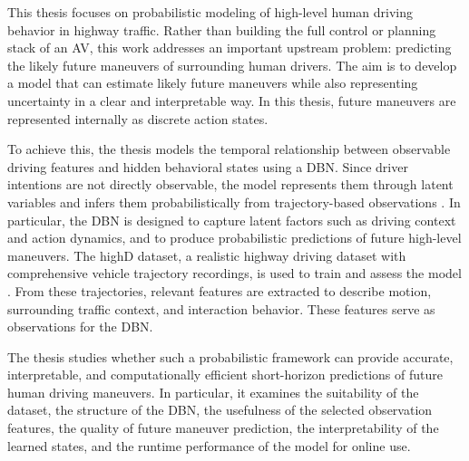 \par This thesis focuses on probabilistic modeling of high-level human driving behavior in highway traffic. 
Rather than building the full control or planning stack of an \ac{AV}, this work addresses an important upstream problem: predicting the likely future maneuvers of surrounding human drivers. 
The aim is to develop a model that can estimate likely future maneuvers while also representing uncertainty in a clear and interpretable way.
In this thesis, future maneuvers are represented internally as discrete action states.

\par To achieve this, the thesis models the temporal relationship between observable driving features and hidden behavioral states using a \ac{DBN}. 
Since driver intentions are not directly observable, the model represents them through latent variables and infers them probabilistically from trajectory-based observations \cite{murphy2002dynamic}. 
In particular, the \ac{DBN} is designed to capture latent factors such as driving context and action dynamics, and to produce probabilistic predictions of future high-level maneuvers.
The highD dataset, a realistic highway driving dataset with comprehensive vehicle trajectory recordings, is used to train and assess the model \cite{krajewski2018highddatasetdronedataset}. From these trajectories, 
relevant features are extracted to describe motion, surrounding traffic context, and interaction behavior. These features serve as observations for the \ac{DBN}.

\par The thesis studies whether such a probabilistic framework can provide accurate, interpretable, and computationally efficient short-horizon predictions of future human driving maneuvers. 
In particular, it examines the suitability of the dataset, the structure of the \ac{DBN}, the usefulness of the selected observation features, the quality of future maneuver prediction, 
the interpretability of the learned states, and the runtime performance of the model for online use.

